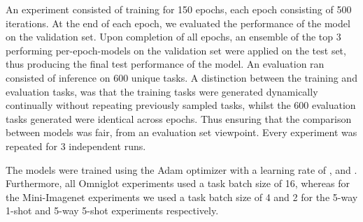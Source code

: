 \documentclass{article} \usepackage[dvipsnames]{xcolor}
\begin{document}
An experiment consisted of training for 150 epochs, each epoch consisting of 500 iterations. At the end of each epoch, we evaluated the performance of the model on the validation set. Upon completion of all epochs, an ensemble of the top 3 performing per-epoch-models on the validation set were applied on the test set, thus producing the final test performance of the model. An evaluation ran consisted of inference on 600 unique tasks. A distinction between the training and evaluation tasks, was that the training tasks were generated dynamically continually without repeating previously sampled tasks, whilst the 600 evaluation tasks generated were identical across epochs. Thus ensuring that the comparison between models was fair, from an evaluation set viewpoint. Every experiment was repeated for 3 independent runs.

The models were trained using the Adam optimizer with a learning rate of ,  and . Furthermore, all Omniglot experiments used a task batch size of 16, whereas for the Mini-Imagenet experiments we used a task batch size of 4 and 2 for the 5-way 1-shot and 5-way 5-shot experiments respectively.
\end{document}
